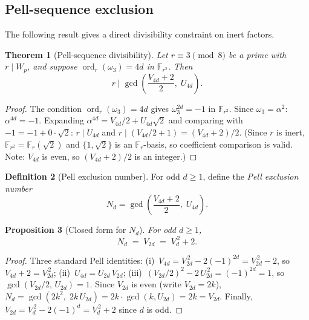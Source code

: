 \documentclass[12pt]{article}
\theoremstyle{plain}
\newtheorem{theorem}{Theorem}[section]
\newtheorem{proposition}[theorem]{Proposition}
\theoremstyle{definition}
\newtheorem{definition}[theorem]{Definition}
\theoremstyle{remark}
\begin{document}
\subsection{Pell-sequence exclusion}


The following result gives a direct divisibility constraint on
inert factors.

\begin{theorem}[Pell-sequence divisibility]\label{thm:pell-divisibility}
Let
\(r \equiv 3 \pmod{8}\) be a prime with \(r \mid W_p\), and suppose
\(\operatorname{ord}_r(\omega_3) = 4d\) in \(\mathbb{F}_{r^2}\). Then
\[
r \mid \gcd\!\left(\frac{V_{4d}+2}{2},\; U_{4d}\right).
\]
\end{theorem}


\begin{proof}
The condition \(\operatorname{ord}_r(\omega_3) = 4d\) gives
\(\omega_3^{2d} = -1\) in \(\mathbb{F}_{r^2}\). Since
\(\omega_3 = \alpha^2\): \(\alpha^{4d} = -1\). Expanding
\(\alpha^{4d} = V_{4d}/2 + U_{4d}\sqrt{2}\) and comparing with
\(-1 = -1 + 0 \cdot \sqrt{2}\):
\(r \mid U_{4d}\) and \(r \mid (V_{4d}/2 + 1) = (V_{4d}+2)/2\).
(Since \(r\) is inert, \(\mathbb{F}_{r^2} = \mathbb{F}_r(\sqrt{2})\)
and \(\{1, \sqrt{2}\}\) is an \(\mathbb{F}_r\)-basis, so coefficient
comparison is valid. Note: \(V_{4d}\) is even, so \((V_{4d}+2)/2\)
is an integer.)\end{proof}


\begin{definition}[Pell exclusion number]\label{def:pell-exclusion-number}
For odd \(d \geq 1\), define the \emph{Pell exclusion number}
\[
N_d = \gcd\!\left(\frac{V_{4d}+2}{2},\; U_{4d}\right).
\]
\end{definition}


\begin{proposition}[Closed form for $N_d$]\label{prop:Nd-closed-form}
For odd \(d \geq 1\),
\[
N_d \;=\; V_{2d} \;=\; V_d^{\,2} + 2.
\]
\end{proposition}

\begin{proof}
Three standard Pell identities:
(i)~\(V_{4d} = V_{2d}^{\,2} - 2(-1)^{2d} = V_{2d}^{\,2} - 2\), so
\(V_{4d} + 2 = V_{2d}^{\,2}\);
(ii)~\(U_{4d} = U_{2d}\, V_{2d}\);
(iii)~\((V_{2d}/2)^2 - 2\,U_{2d}^{\,2} = (-1)^{2d} = 1\), so
\(\gcd(V_{2d}/2,\, U_{2d}) = 1\).
Since \(V_{2d}\) is even (write \(V_{2d} = 2k\)),
\(N_d = \gcd(2k^2,\; 2k\,U_{2d}) = 2k\cdot\gcd(k, U_{2d}) = 2k = V_{2d}\).
Finally, \(V_{2d} = V_d^{\,2} - 2(-1)^d = V_d^{\,2} + 2\) since \(d\) is odd.
\end{proof}
\end{document}
